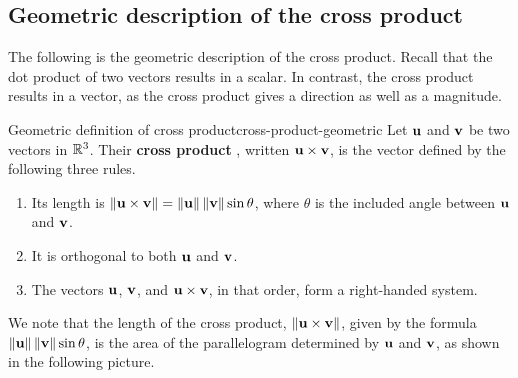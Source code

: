 \subsection{Geometric description of the cross product}

The following is the geometric description of the cross
product. Recall that the dot product of two vectors results in a
scalar. In contrast, the cross product results in a vector, as the
cross product gives a direction as well as a magnitude.%

\begin{definition}{Geometric definition of cross product}{cross-product-geometric}
  Let\/ $\vect{u}$ and $\vect{v}$ be two vectors in $\mathbb{R}^3$. Their
  \textbf{cross product}%
  , written $\vect{u}\times \vect{v}$, is the
  vector defined by the following three rules.%

  \begin{enumerate}
  \item Its length is $\norm{\vect{u}\times \vect{v}} =\norm{\vect{u}} \norm{
      \vect{v}} \sin \theta$,
    where $\theta$ is the included angle between $\vect{u}$ and $\vect{v}$.

  \item It is orthogonal to both $\vect{u}$ and $\vect{v}$.

  \item The vectors $\vect{u}$, $\vect{v}$, and $\vect{u}\times
    \vect{v}$, in that order, form a right-handed system.
  \end{enumerate}
\end{definition}

We note that the length of the cross product,
$\norm{\vect{u}\times\vect{v}}$, given by the formula
$\norm{\vect{u}}\norm{\vect{v}}\sin\theta$, is the area of the
parallelogram determined by $\vect{u}$ and $\vect{v}$, as shown in the
following picture.%
%
%
%
\begin{center}
\end{center}
